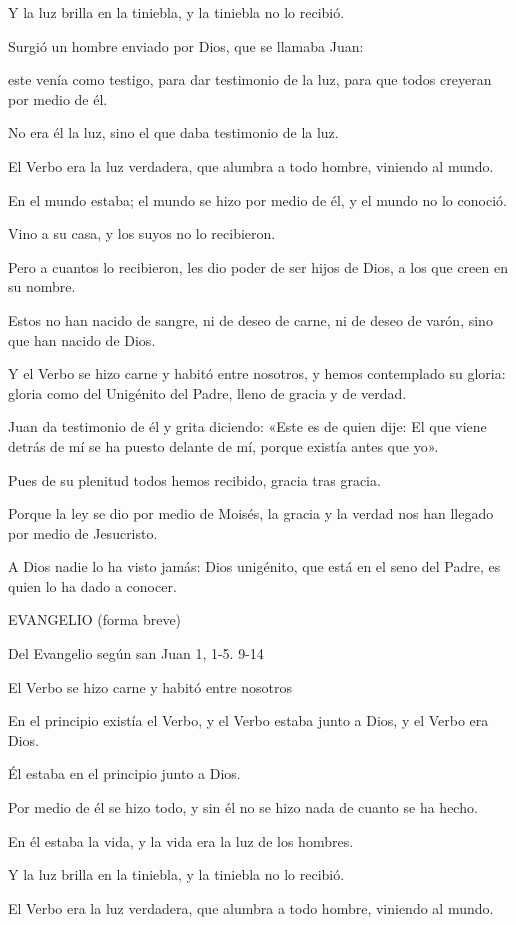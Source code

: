 Y la luz brilla en la tiniebla, y la tiniebla no lo recibió.

Surgió un hombre enviado por Dios, que se llamaba Juan:

este venía como testigo, para dar testimonio de la luz, para que todos
creyeran por medio de él.

No era él la luz, sino el que daba testimonio de la luz.

El Verbo era la luz verdadera, que alumbra a todo hombre, viniendo al
mundo.

En el mundo estaba; el mundo se hizo por medio de él, y el mundo no lo
conoció.

Vino a su casa, y los suyos no lo recibieron.

Pero a cuantos lo recibieron, les dio poder de ser hijos de Dios, a los
que creen en su nombre.

Estos no han nacido de sangre, ni de deseo de carne, ni de deseo de
varón, sino que han nacido de Dios.

Y el Verbo se hizo carne y habitó entre nosotros, y hemos contemplado su
gloria: gloria como del Unigénito del Padre, lleno de gracia y de
verdad.

Juan da testimonio de él y grita diciendo: «Este es de quien dije: El
que viene detrás de mí se ha puesto delante de mí, porque existía antes
que yo».

Pues de su plenitud todos hemos recibido, gracia tras gracia.

Porque la ley se dio por medio de Moisés, la gracia y la verdad nos han
llegado por medio de Jesucristo.

A Dios nadie lo ha visto jamás: Dios unigénito, que está en el seno del
Padre, es quien lo ha dado a conocer.

EVANGELIO (forma breve)

Del Evangelio según san Juan 1, 1-5. 9-14

El Verbo se hizo carne y habitó entre nosotros

En el principio existía el Verbo, y el Verbo estaba junto a Dios, y el
Verbo era Dios.

Él estaba en el principio junto a Dios.

Por medio de él se hizo todo, y sin él no se hizo nada de cuanto se ha
hecho.

En él estaba la vida, y la vida era la luz de los hombres.

Y la luz brilla en la tiniebla, y la tiniebla no lo recibió.

El Verbo era la luz verdadera, que alumbra a todo hombre, viniendo al
mundo.

